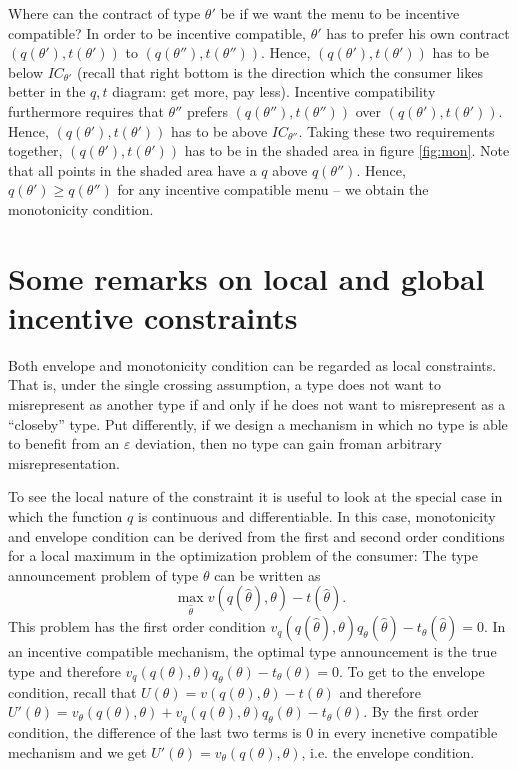 \documentclass[12pt]{article}
\begin{document}
Where can the contract of type $\theta '$ be if we want the menu to be incentive compatible? In order to be incentive compatible, $\theta '$ has to prefer his own contract $(q(\theta '),t(\theta '))$ to $(q(\theta ''),t(\theta ''))$. Hence, $(q(\theta '),t(\theta '))$ has to be below $IC_{\theta '}$ (recall that right bottom is the direction which the consumer likes better in the $q,t$ diagram: get more, pay less). Incentive compatibility furthermore requires that $\theta ''$ prefers $(q(\theta ''),t(\theta ''))$ over $(q(\theta '),t(\theta '))$. Hence, $(q(\theta '),t(\theta '))$ has to be above $IC_{\theta ''}$. Taking these two requirements together, $(q(\theta '),t(\theta '))$ has to be in the shaded area in figure \ref{fig:mon}. Note that all points in the shaded area have a $q$ above $q(\theta '')$. Hence, $q(\theta ')\geq q(\theta '')$ for any incentive compatible menu -- we obtain the monotonicity condition.

\section{Some remarks on local and global incentive constraints}

Both envelope and monotonicity condition can be regarded as local constraints. That is, under the single crossing assumption, a type does not want to misrepresent as another type if and only if he does not want to misrepresent as a ``closeby'' type. Put differently, if we design a mechanism in which no type is able to benefit from an $\varepsilon $ deviation, then no type can gain froman arbitrary misrepresentation.

To see the local nature of the constraint it is useful to look at the special case in which the function $q$ is continuous and differentiable. In this case, monotonicity and envelope condition can be derived from the first and second order conditions for a local maximum in the optimization problem of the consumer:  The type announcement problem of type $\theta $ can be written as
\begin{equation*}
  \max_{\hat \theta }v(q(\hat{\theta }),\theta )-t(\hat{\theta }).
\end{equation*}
This problem has the first order condition $v_q(q(\hat\theta ),\theta )q_\theta (\hat \theta)-t_\theta (\hat{ \theta })=0$. In an incentive compatible mechanism, the optimal type announcement is the true type and therefore $v_q(q(\theta ),\theta )q_\theta ( \theta)-t_\theta ({ \theta })=0$. To get to the envelope condition, recall that $U(\theta )=v(q(\theta ),\theta )-t(\theta )$ and therefore $U'(\theta )=v_\theta (q(\theta ),\theta )+v_q(q(\theta ),\theta )q_\theta ( \theta)-t_\theta ({ \theta })$. By the first order condition, the difference of the last two terms is 0 in every incnetive compatible mechanism and we get $U'(\theta )=v_\theta (q(\theta ),\theta )$, i.e. the envelope condition.
\end{document}
